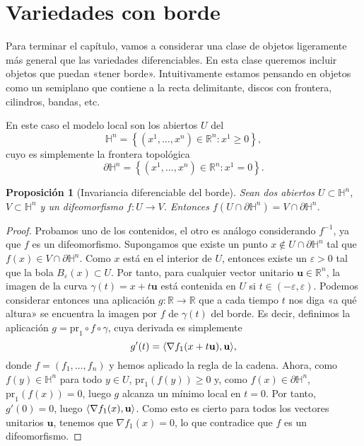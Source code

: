 \documentclass[12pt,a4paper]{book}
\newtheorem{prop}[thm]{Proposición}
\theoremstyle{definition} \newtheorem{defn}[thm]{Definición}
\theoremstyle{definition} \newtheorem{ejemplo}[thm]{Ejemplo}
\theoremstyle{definition} \newtheorem{ejercicio}[thm]{Ejercicio}
\theoremstyle{remark} \newtheorem*{obs}{Observación}
\def\RR{\mathbb{R}}
\def\HH{\mathbb{H}}
\def\pr{\mathrm{pr}}
\def\eps{\varepsilon}
\newcommand{\ve}[1]{\mathbf{#1}}
\DeclarePairedDelimiter\esc{\langle}{\rangle}
\let\emph\relax
\begin{document}
	  \section{Variedades con borde}
	  Para terminar el capítulo, vamos a considerar una clase de objetos ligeramente más general que las variedades diferenciables. En esta clase queremos incluir objetos que puedan «tener borde». Intuitivamente estamos pensando en objetos como un semiplano que contiene a la recta delimitante, discos con frontera, cilindros, bandas, etc. 

	En este caso el modelo local son los abiertos $U$ del \emph{semiespacio cerrado}
	\begin{equation*}
	  \HH^n = \left\{ (x^1,\dots,x^n) \in \RR^n : x^1 \geq 0 \right\},
	\end{equation*}
	cuyo \emph{borde} es simplemente la frontera topológica
	\begin{equation*}
	  \partial \HH^n = \left\{ (x^1,\dots,x^n) \in \RR^n: x^1=0 \right\}.
	\end{equation*}

	\begin{prop}[Invariancia diferenciable del borde]\label{borde}
	Sean dos abiertos $U\subset \HH^n$, $V\subset \HH^n$ y un difeomorfismo $f:U\rightarrow V$. Entonces $f(U\cap \partial \HH^n)= V \cap \partial \HH^n$.
	\end{prop}
	\begin{proof}
	  Probamos uno de los contenidos, el otro es análogo considerando $f^{-1}$, ya que $f$ es un difeomorfismo. Supongamos que existe un punto $x\not \in U\cap \partial \HH^n$ tal que $f(x) \in V\cap \partial \HH^n$. Como $x$ está en el interior de $U$, entonces existe un $\eps >0$ tal que la bola $B_\eps (x) \subset U$. Por tanto, para cualquier vector unitario $\ve{u}\in \RR^n$, la imagen de la curva $\gamma(t)=x+t\ve{u}$ está contenida en $U$ si $t\in (-\eps,\eps)$. Podemos considerar entonces una aplicación $g:\RR\rightarrow \RR$ que a cada tiempo $t$ nos diga «a qué altura» se encuentra la imagen por $f$ de $\gamma(t)$ del borde. Es decir, definimos la aplicación $g=\pr_1 \circ f \circ \gamma$, cuya derivada es simplemente 
	  \begin{equation*}
	    g'(t)=\esc{\nabla f_1(x+t\ve{u}),\ve{u}},
	  \end{equation*}
	  donde $f=(f_1,\dots,f_n)$ y hemos aplicado la regla de la cadena. Ahora, como $f(y) \in \HH^n$ para todo $y\in U$, $\pr_1(f(y))\geq 0$ y, como $f(x)\in \partial \HH^n$, $\pr_1(f(x))=0$, luego $g$ alcanza un mínimo local en $t=0$. Por tanto, $g'(0)=0$, luego $\esc{\nabla f_1(x), \ve{u}}$. Como esto es cierto para todos los vectores unitarios $\ve{u}$, tenemos que $\nabla f_1(x)=0$, lo que contradice que $f$ es un difeomorfismo.
	\end{proof}
\end{document}
